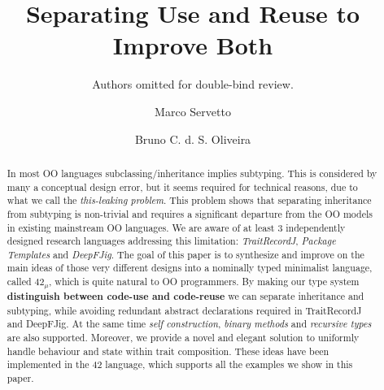 \documentclass[a4paper,UKenglish]{lipics-v2016}
\title{Separating Use and Reuse to Improve Both}
\author{Authors omitted for double-bind review.}
\author{Marco Servetto\inst{1} \and Bruno C. d. S. Oliveira\inst{2}}
\institute{Victoria University of Wellington, New Zealand,\\
\and
The University of Hong Kong, Hong Kong\\}
\newcommand\saveSpace{}
\newcommand\name{{\bf $42_{\mu}$}\xspace}
\begin{document}
\maketitle

\begin{abstract}
\saveSpace\saveSpace\saveSpace
In most OO languages subclassing/inheritance implies
subtyping. This is considered by many a conceptual design error, but it
seems required for technical reasons, due to what we call the
\emph{this-leaking problem}. This problem shows that separating
inheritance from subtyping is non-trivial and requires a significant
departure from the OO models in existing mainstream OO languages.
We are aware of at least 3 independently designed research languages 
addressing this limitation: \emph{TraitRecordJ}, \emph{Package Templates} and \emph{DeepFJig}.
The goal of this paper is to synthesize and improve on
the main ideas of those very different designs into a nominally typed
minimalist language, called \name, which is quite
natural to OO programmers.
By making our type system \textbf{distinguish between code-use and code-reuse}
we can separate inheritance and subtyping, while avoiding 
redundant abstract declarations required in TraitRecordJ and
DeepFJig. At the same time \emph{self construction},
\emph{binary methods} and \emph{recursive types} are also supported.
Moreover, we provide a novel and elegant solution to uniformly
handle behaviour and state within trait composition.
These ideas have been implemented in the 42 language, 
which supports all the examples we show in this paper.
\saveSpace\saveSpace\saveSpace

\saveSpace\saveSpace\saveSpace
\end{abstract}


















\end{document}
